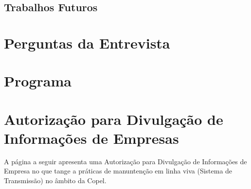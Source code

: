\documentclass[openright]{normas-utf-tex} %
\begin{document}
	\section{Trabalhos Futuros}
		

\clearpage %
\label{bibstart}
\label{bibend}

\apendice
\chapter{Perguntas da Entrevista}
\label{pergunta}


\chapter{Programa}
\label{program}


\chapter{Autorização para Divulgação de Informações de Empresas}

A página a seguir apresenta uma Autorização para Divulgação de Informações de Empresa no que tange a práticas de manuntenção em linha viva (Sistema de Transmissão) no âmbito da Copel.


\end{document}
